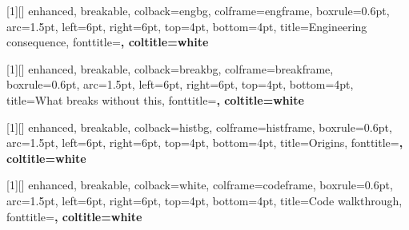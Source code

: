 [1][]{%
  enhanced, breakable, colback=engbg, colframe=engframe,
  boxrule=0.6pt, arc=1.5pt, left=6pt, right=6pt, top=4pt, bottom=4pt,
  title={Engineering consequence},
  fonttitle=\bfseries\small, coltitle=white}

[1][]{%
  enhanced, breakable, colback=breakbg, colframe=breakframe,
  boxrule=0.6pt, arc=1.5pt, left=6pt, right=6pt, top=4pt, bottom=4pt,
  title={What breaks without this},
  fonttitle=\bfseries\small, coltitle=white}

[1][]{%
  enhanced, breakable, colback=histbg, colframe=histframe,
  boxrule=0.6pt, arc=1.5pt, left=6pt, right=6pt, top=4pt, bottom=4pt,
  title={Origins},
  fonttitle=\bfseries\small, coltitle=white}

[1][]{%
  enhanced, breakable, colback=white, colframe=codeframe,
  boxrule=0.6pt, arc=1.5pt, left=6pt, right=6pt, top=4pt, bottom=4pt,
  title={Code walkthrough},
  fonttitle=\bfseries\small, coltitle=white}

\newcommand{\E}{\mathbb{E}}
\newcommand{\Prob}{\mathbb{P}}
\newcommand{\Var}{\operatorname{Var}}
\newcommand{\Cov}{\operatorname{Cov}}
\newcommand{\Corr}{\operatorname{Corr}}
\newcommand{\R}{\mathbb{R}}
\newcommand{\gauss}{\mathcal{N}}
\newcommand{\ind}[1]{\mathbf{1}\{#1\}}
\newcommand{\LSE}{\operatorname{LSE}}
\DeclareMathOperator*{\argmax}{arg\,max}
\DeclareMathOperator*{\argmin}{arg\,min}
\newcommand{\vx}{\bm{x}}
\newcommand{\vy}{\bm{y}}
\newcommand{\vz}{\bm{z}}
\newcommand{\vh}{\bm{h}}
\newcommand{\vpi}{\bm{\pi}}
\newcommand{\IC}{\mathrm{IC}}
\newcommand{\ICbar}{\overline{\mathrm{IC}}}
\newcommand{\ICIR}{\mathrm{ICIR}}
\newcommand{\NLL}{\mathrm{NLL}}
\newcommand{\code}[1]{\texttt{#1}}

\newcommand{\exercisehead}{\section*{Exercises}\addcontentsline{toc}{section}{Exercises}}
